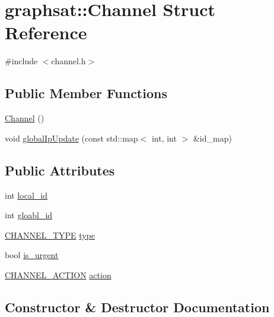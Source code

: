 \hypertarget{structgraphsat_1_1_channel}{}\section{graphsat\+::Channel Struct Reference}
\label{structgraphsat_1_1_channel}


{\ttfamily \#include $<$channel.\+h$>$}

\subsection*{Public Member Functions}
\begin{DoxyCompactItemize}
\item 
\mbox{\hyperlink{structgraphsat_1_1_channel_ac739f66162acd3f61032d1b0e3325b2c}{Channel}} ()
\item 
void \mbox{\hyperlink{structgraphsat_1_1_channel_a334cfc78cfcb728f178d2566a639b6f6}{global\+Ip\+Update}} (const std\+::map$<$ int, int $>$ \&id\+\_\+map)
\end{DoxyCompactItemize}
\subsection*{Public Attributes}
\begin{DoxyCompactItemize}
\item 
int \mbox{\hyperlink{structgraphsat_1_1_channel_a3852c6ef7fdc21e5873caac1b34b3493}{local\+\_\+id}}
\item 
int \mbox{\hyperlink{structgraphsat_1_1_channel_a9f9c88b4f0aaea8878c39f740dacad7e}{gloabl\+\_\+id}}
\item 
\mbox{\hyperlink{namespacegraphsat_a0c6d85311290cc56a9ca1b39edcf6a75}{C\+H\+A\+N\+N\+E\+L\+\_\+\+T\+Y\+PE}} \mbox{\hyperlink{structgraphsat_1_1_channel_aae966aacfb4c1809b86571d6edc85931}{type}}
\item 
bool \mbox{\hyperlink{structgraphsat_1_1_channel_a732172762c3bfe8b06d9fca5f9449f99}{is\+\_\+urgent}}
\item 
\mbox{\hyperlink{namespacegraphsat_a67a431baf7f0e88f25c885fbf855531c}{C\+H\+A\+N\+N\+E\+L\+\_\+\+A\+C\+T\+I\+ON}} \mbox{\hyperlink{structgraphsat_1_1_channel_ad8c5ffd4866ae5cc5edaa0e643e10b95}{action}}
\end{DoxyCompactItemize}


\subsection{Constructor \& Destructor Documentation}
\mbox{\label{structgraphsat_1_1_channel_ac739f66162acd3f61032d1b0e3325b2c}} 
